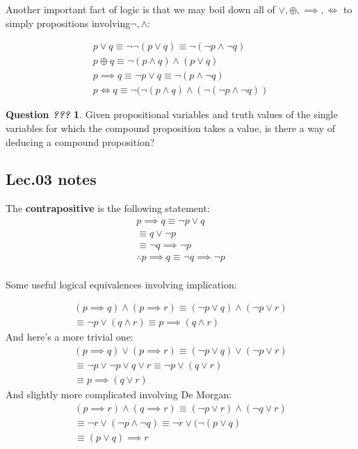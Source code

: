 \documentclass{article}
\theoremstyle{definition}
\newtheorem{question}{Question \textit{???}}
\begin{document}
Another important fact of logic is that we may boil down all of $\lor, \oplus, \implies, \iff$ to simply propositions involving$\neg, \land$: 

\begin{align*}
    p \lor q \equiv \neg \neg (p \lor q) \equiv \neg(\neg p \land \neg q)\\
    p \oplus q \equiv \neg(p \land q) \land (p \lor q)\\
    p \implies q \equiv \neg p \lor q \equiv \neg (p \land \neg q)\\
    p \iff q \equiv \neg(\neg(p\land q) \land (\neg (\neg p \land \neg q))
\end{align*}


\begin{question}
Given propositional variables and truth values of the single variables for which the compound proposition takes a value, is there a way of deducing a compound proposition? 
\end{question}
\newpage
\subsection{Lec.03 notes}

The \textbf{contrapositive} is the following statement:
\begin{align*}
    p \implies q \equiv \neg p \lor q\\
    \equiv q \lor \neg p\\
    \equiv \neg q \implies \neg p\\
    \therefore p \implies q \equiv \neg q \implies \neg p
\end{align*}
\\
Some useful logical equivalences involving implication:

\begin{align*}
    (p \implies q) \land (p \implies r) \equiv (\neg p \lor q) \land (\neg p \lor r)\\
    \equiv \neg p \lor (q \land r) \equiv p \implies (q \land r)
\end{align*}
And here's a more trivial one: 
\begin{align*}
    (p \implies q) \lor (p \implies r) \equiv (\neg p \lor q) \lor (\neg p \lor r)\\
    \equiv \neg p \lor \neg p \lor q \lor r \equiv \neg p \lor (q \lor r)\\
    \equiv p \implies (q \lor r)
\end{align*}
And slightly more complicated involving De Morgan:
\begin{align*}
    (p \implies r) \land (q \implies r) \equiv (\neg p \lor r) \land (\neg q \lor r)\\
    \equiv \neg r \lor (\neg p \land \neg q) \equiv \neg r \lor (\neg(p \lor q)\\
    \equiv (p \lor q) \implies r 
\end{align*}
\end{document}
